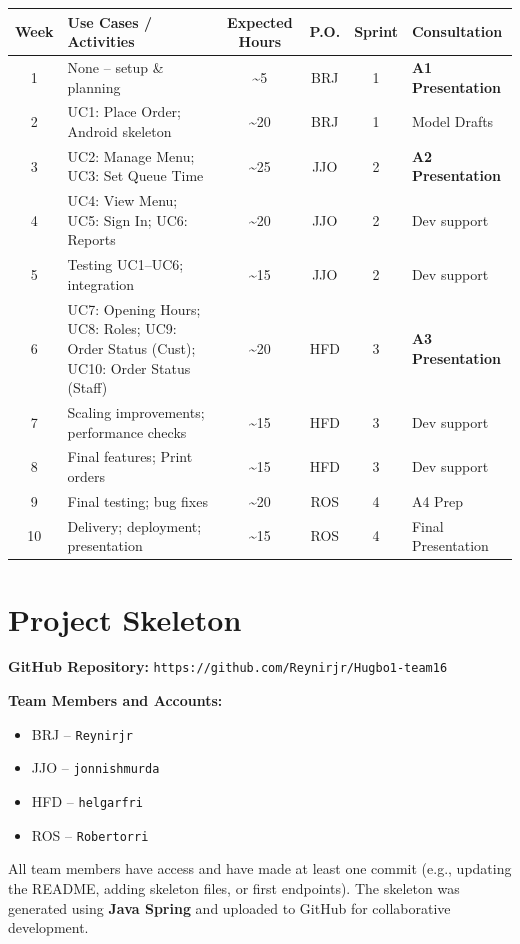 \documentclass{article}
\begin{document}
\begin{center}
\renewcommand{\arraystretch}{1.6} %
\large %
\begin{adjustbox}{max width=\textwidth}
\begin{tabular}{|c|>{\raggedright\arraybackslash}p{5cm}|c|c|c|>{\raggedright\arraybackslash}p{4cm}|}
\hline
\textbf{Week} & \textbf{Use Cases / Activities} & \textbf{Expected Hours} & \textbf{P.O.} & \textbf{Sprint} & \textbf{Consultation} \\ \hline
1  & None -- setup \& planning                    & \textasciitilde5  & BRJ & 1 & \textbf{A1 Presentation} \\ \hline
2  & UC1: Place Order; Android skeleton           & \textasciitilde20 & BRJ & 1 & Model Drafts \\ \hline
3  & UC2: Manage Menu; UC3: Set Queue Time        & \textasciitilde25 & JJO & 2 & \textbf{A2 Presentation} \\ \hline
4  & UC4: View Menu; UC5: Sign In; UC6: Reports   & \textasciitilde20 & JJO & 2 & Dev support \\ \hline
5  & Testing UC1--UC6; integration                & \textasciitilde15 & JJO & 2 & Dev support \\ \hline
6  & UC7: Opening Hours; UC8: Roles; UC9: Order Status (Cust); UC10: Order Status (Staff) & \textasciitilde20 & HFD & 3 & \textbf{A3 Presentation} \\ \hline
7  & Scaling improvements; performance checks     & \textasciitilde15 & HFD & 3 & Dev support \\ \hline
8  & Final features; Print orders                & \textasciitilde15 & HFD & 3 & Dev support \\ \hline
9  & Final testing; bug fixes                     & \textasciitilde20 & ROS & 4 & A4 Prep \\ \hline
10 & Delivery; deployment; presentation           & \textasciitilde15 & ROS & 4 & Final Presentation \\ \hline
\end{tabular}
\end{adjustbox}
\end{center}


\section{Project Skeleton}

\textbf{GitHub Repository:} \texttt{https://github.com/Reynirjr/Hugbo1-team16}

\textbf{Team Members and Accounts:}
\begin{itemize}
    \item BRJ -- \texttt{Reynirjr}
    \item JJO -- \texttt{jonnishmurda}
    \item HFD -- \texttt{helgarfri}
    \item ROS -- \texttt{Robertorri}
\end{itemize}

All team members have access and have made at least one commit (e.g., updating the README, adding skeleton files, or first endpoints).  
The skeleton was generated using \textbf{Java Spring} and uploaded to GitHub for collaborative development.
\end{document}

